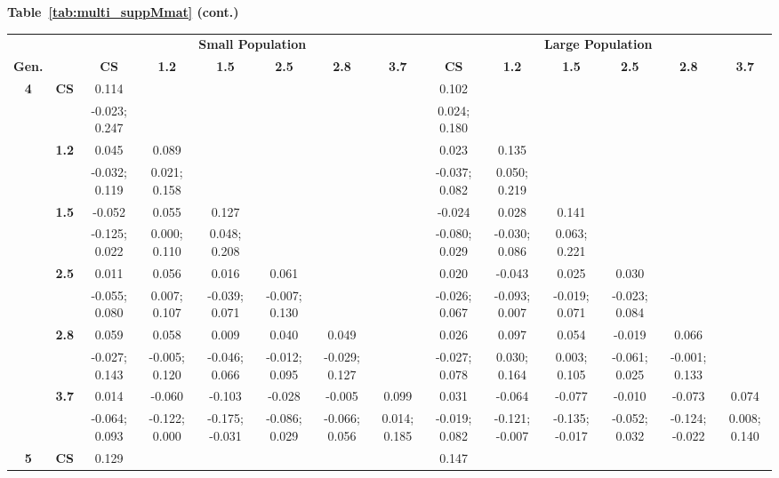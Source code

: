  \FloatBarrier
\begin{landscape}
\textbf{Table~\ref{tab:multi_suppMmat} (cont.)}
\begin{table}[!htp]
\renewcommand{\arraystretch}{0.8}
\scriptsize
\begin{center}
\begin{tabular}{>{\bfseries}c>{\bfseries}ccccccccccccc}
\toprule
&& \multicolumn{6}{c}{\textbf{Small Population}} & \multicolumn{6}{c}{\textbf{Large Population}}\\ [1.25ex]
Gen. && \textbf{CS} & \textbf{1.2} & \textbf{1.5} & \textbf{2.5} & \textbf{2.8} & \textbf{3.7} & 
\textbf{CS} & \textbf{1.2} & \textbf{1.5} & \textbf{2.5} & \textbf{2.8} & \textbf{3.7}\\
\midrule
4 & CS & 0.114 &  &  &  &  &  & 0.102 &  &  &  &  & \\
 &  & -0.023; 0.247 &  &  &  &  &  & 0.024; 0.180 &  &  &  &  & \\[0.7ex]
 & 1.2 & 0.045 & 0.089 &  &  &  &  & 0.023 & 0.135 &  &  &  & \\
 &  & -0.032; 0.119 & 0.021; 0.158 &  &  &  &  & -0.037; 0.082 & 0.050; 0.219 &  &  &  & \\[0.7ex]
 & 1.5 & -0.052 & 0.055 & 0.127 &  &  &  & -0.024 & 0.028 & 0.141 &  &  & \\
 &  & -0.125; 0.022 & 0.000; 0.110 & 0.048; 0.208 &  &  &  & -0.080; 0.029 & -0.030; 0.086 & 0.063; 0.221 &  &  & \\[0.7ex]
 & 2.5 & 0.011 & 0.056 & 0.016 & 0.061 &  &  & 0.020 & -0.043 & 0.025 & 0.030 &  & \\
 &  & -0.055; 0.080 & 0.007; 0.107 & -0.039; 0.071 & -0.007; 0.130 &  &  & -0.026; 0.067 & -0.093; 0.007 & -0.019; 0.071 & -0.023; 0.084 &  & \\[0.7ex]
 & 2.8 & 0.059 & 0.058 & 0.009 & 0.040 & 0.049 &  & 0.026 & 0.097 & 0.054 & -0.019 & 0.066 & \\
 &  & -0.027; 0.143 & -0.005; 0.120 & -0.046; 0.066 & -0.012; 0.095 & -0.029; 0.127 &  & -0.027; 0.078 & 0.030; 0.164 & 0.003; 0.105 & -0.061; 0.025 & -0.001; 0.133 & \\[0.7ex]
 & 3.7 & 0.014 & -0.060 & -0.103 & -0.028 & -0.005 & 0.099 & 0.031 & -0.064 & -0.077 & -0.010 & -0.073 & 0.074\\
 &  & -0.064; 0.093 & -0.122; 0.000 & -0.175; -0.031 & -0.086; 0.029 & -0.066; 0.056 & 0.014; 0.185 & -0.019; 0.082 & -0.121; -0.007 & -0.135; -0.017 & -0.052; 0.032 & -0.124; -0.022 & 0.008; 0.140\\[0.7ex]
 \midrule
5 & CS & 0.129 &  &  &  &  &  & 0.147 &  &  &  &  & \\

\end{tabular}
\end{center}
\end{table}
\end{landscape}
